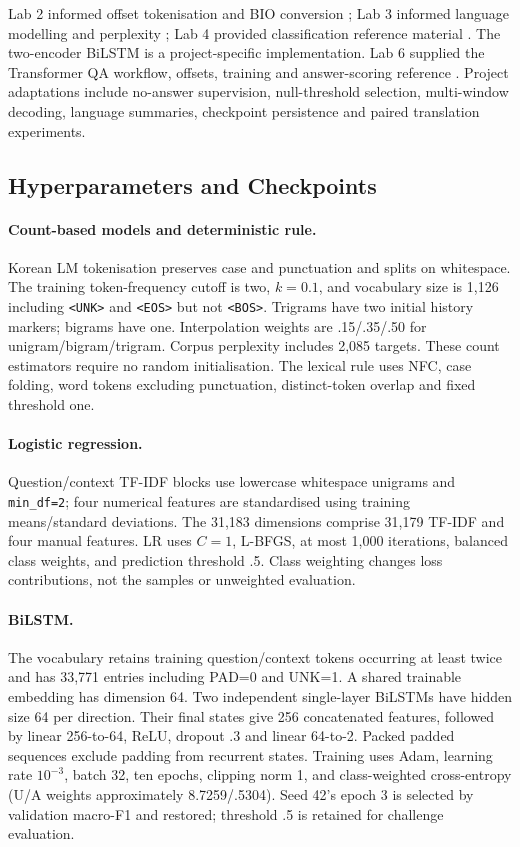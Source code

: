 \documentclass[11pt]{article}
\newcommand{\unk}{\texttt{<UNK>}}
\newcommand{\bos}{\texttt{<BOS>}}
\newcommand{\eos}{\texttt{<EOS>}}
\begin{document}
Lab 2 informed offset tokenisation and BIO conversion \citep{lab2}; Lab 3 informed language modelling and perplexity \citep{lab3}; Lab 4 provided classification reference material \citep{lab4}. The two-encoder BiLSTM is a project-specific implementation. Lab 6 supplied the Transformer QA workflow, offsets, training and answer-scoring reference \citep{lab6}. Project adaptations include no-answer supervision, null-threshold selection, multi-window decoding, language summaries, checkpoint persistence and paired translation experiments.

\subsection{Hyperparameters and Checkpoints}
\paragraph{Count-based models and deterministic rule.}
Korean LM tokenisation preserves case and punctuation and splits on whitespace. The training token-frequency cutoff is two, $k=0.1$, and vocabulary size is 1,126 including \unk{} and \eos{} but not \bos{}. Trigrams have two initial history markers; bigrams have one. Interpolation weights are .15/.35/.50 for unigram/bigram/trigram. Corpus perplexity includes 2,085 targets. These count estimators require no random initialisation. The lexical rule uses NFC, case folding, word tokens excluding punctuation, distinct-token overlap and fixed threshold one.

\paragraph{Logistic regression.}
Question/context TF-IDF blocks use lowercase whitespace unigrams and \texttt{min\_df=2}; four numerical features are standardised using training means/standard deviations. The 31,183 dimensions comprise 31,179 TF-IDF and four manual features. LR uses $C=1$, L-BFGS, at most 1,000 iterations, balanced class weights, and prediction threshold .5. Class weighting changes loss contributions, not the samples or unweighted evaluation.

\paragraph{BiLSTM.}
The vocabulary retains training question/context tokens occurring at least twice and has 33,771 entries including PAD=0 and UNK=1. A shared trainable embedding has dimension 64. Two independent single-layer BiLSTMs have hidden size 64 per direction. Their final states give 256 concatenated features, followed by linear 256-to-64, ReLU, dropout .3 and linear 64-to-2. Packed padded sequences exclude padding from recurrent states. Training uses Adam, learning rate $10^{-3}$, batch 32, ten epochs, clipping norm 1, and class-weighted cross-entropy (U/A weights approximately 8.7259/.5304). Seed 42's epoch 3 is selected by validation macro-F1 and restored; threshold .5 is retained for challenge evaluation.
\end{document}
